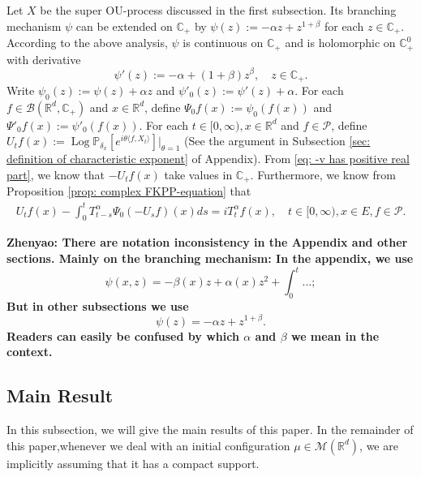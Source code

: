 \documentclass[12pt,oneside,english]{amsart}
\theoremstyle{plain}
\theoremstyle{definition}
\numberwithin{equation}{section}
\begin{document}
\subsection{}
    Let $X$ be the super OU-process discussed in the first subsection.
    Its branching mechanism $\psi$ can be extended on $\mathbb C_+$ by $\psi(z) := -\alpha z + z^{1+\beta}$ for each $z\in \mathbb C_+$.
    According to the above analysis, $\psi$ is continuous on $\mathbb C_+$ and is holomorphic on $\mathbb C_+^0$ with derivative
\begin{equation}
\label{eq: deriavetive of the Poission part}
    \psi'(z) := -\alpha + (1+\beta)z^{\beta},
    \quad z\in \mathbb C_+.
\end{equation}
    Write $\psi_0(z) := \psi(z) + \alpha z$ and $\psi'_0(z) := \psi'(z) + \alpha$.
    For each $f\in \mathscr B(\mathbb R^d, \mathbb C_+)$ and $x\in \mathbb R^d$, define $\Psi_0f(x) := \psi_0(f(x))$ and $\Psi'_0 f(x) := \psi'_0(f(x))$.
    For each $t\in [0,\infty), x\in \mathbb R^d $ and $f \in \mathcal{P}$, define $U_tf(x) := \operatorname{Log} \mathbb P_{\delta_x}[e^{i\theta \langle f, X_t\rangle}]|_{\theta = 1}$
    (See the argument in Subsection \ref{sec: definition of characteristic exponent} of Appendix).
    From \eqref{eq: -v has positive real part}, we know that $-U_tf(x)$ take values in $\mathbb C_+$. Furthermore, we know from Proposition \ref{prop: complex FKPP-equation} that
\begin{align}
\label{eq:chareq2}
    U_tf(x)-\int_0^t T^{\alpha}_{t-s} \Psi_0(-U_sf)(x)ds
    =i T^{\alpha}_t f(x),
    \quad t\in [0,\infty), x\in E, f\in \mathcal P.
\end{align}

    {\bf Zhenyao: There are notation inconsistency in the Appendix and other sections. Mainly on the branching mechanism: In the appendix, we use
\[
    \psi(x,z)= -\beta(x)z+\alpha(x)z^2 + \int_0^t \dots;
\]
    But in other subsections we use
\[
    \psi(z) = - \alpha z + z^{1+\beta}.
\]
    Readers can easily be confused by which $\alpha$ and $\beta$ we mean in the context.}

\subsection{Main Result}

In this subsection, we will give the main results of this paper. In the remainder of this paper,whenever we deal with an initial configuration $\mu \in \mathcal{M}(\mathbb{R}^d)$, we are implicitly assuming that it has a compact support.
\end{document}
